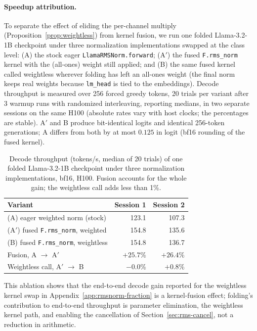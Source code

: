\documentclass{article}
\begin{document}
\paragraph{Speedup attribution.} To separate the effect of eliding the per-channel multiply (Proposition~\ref{prop:weightless}) from kernel fusion, we run one folded Llama-3.2-1B checkpoint under three normalization implementations swapped at the class level: (A) the stock eager \texttt{LlamaRMSNorm.forward}; (A$'$) the fused \texttt{F.rms\_norm} kernel with the (all-ones) weight still applied; and (B) the same fused kernel called weightless wherever folding has left an all-ones weight (the final norm keeps real weights because \texttt{lm\_head} is tied to the embeddings). Decode throughput is measured over 256 forced greedy tokens, 20 trials per variant after 3 warmup runs with randomized interleaving, reporting medians, in two separate sessions on the same H100 (absolute rates vary with host clocks; the percentages are stable). A$'$ and B produce bit-identical logits and identical 256-token generations; A differs from both by at most $0.125$ in logit (bf16 rounding of the fused kernel).

\begin{table}[h!] \centering
\caption{Decode throughput (tokens/s, median of 20 trials) of one folded Llama-3.2-1B checkpoint under three normalization implementations, bf16, H100. Fusion accounts for the whole gain; the weightless call adds less than 1\%.}
\label{tab:attribution}
\begin{tabular}{l r r}
\hline
Variant & Session 1 & Session 2 \\
\hline
(A) eager weighted norm (stock)             & 123.1 & 107.3 \\
(A$'$) fused \texttt{F.rms\_norm}, weighted & 154.8 & 135.6 \\
(B) fused \texttt{F.rms\_norm}, weightless  & 154.8 & 136.7 \\
\hline
Fusion, A $\to$ A$'$                        & $+25.7\%$ & $+26.4\%$ \\
Weightless call, A$'$ $\to$ B               & $-0.0\%$  & $+0.8\%$ \\
\hline
\end{tabular}
\end{table}

This ablation shows that the end-to-end decode gain reported for the weightless kernel swap in Appendix~\ref{app:rmsnorm-fraction} is a kernel-fusion effect; folding's contribution to end-to-end throughput is parameter elimination, the weightless kernel path, and enabling the cancellation of Section~\ref{sec:rms-cancel}, not a reduction in arithmetic.
\end{document}
